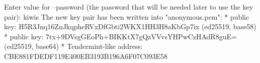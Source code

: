 \begin{shellbox}\begin{ttlst}
Enter value for --password (the password that will be needed later to use the key pair): kiwis
The new key pair has been written into "anonymous.pem":
* public key: H5R3Jnq16ZnJkqpheRVxDfGbti2WKX1HH3H8aKbGp7ix (ed25519, base58)
* public key: 7tx+9DVsgGEoPh+BIKKtX7gQzVVvsYHPwCzHAdR8guE= (ed25519, base64)
* Tendermint-like address: CBE881FDEDF119E400EB3193B196A6F07C093E58
\end{ttlst}\end{shellbox}
